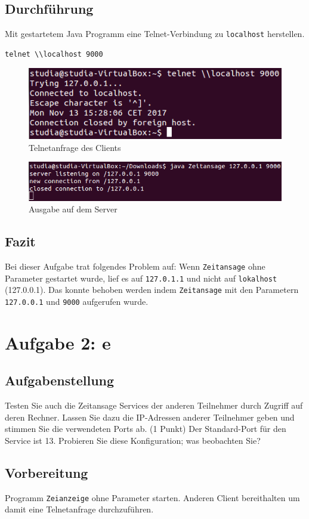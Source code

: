 \subsection{Durchführung}
Mit gestartetem Java Programm eine Telnet-Verbindung zu \texttt{localhost} herstellen.
\begin{lstlisting}
telnet \\localhost 9000
\end{lstlisting}
\begin{figure}[H]
	\centering
	\includegraphics[width=0.4 \linewidth]{images/17}
	\caption{Telnetanfrage des Clients}
\end{figure}
\begin{figure}[H]
	\centering
	\includegraphics[width=0.4 \linewidth]{images/16}
	\caption{Ausgabe auf dem Server}
\end{figure}

\subsection{Fazit}
Bei dieser Aufgabe trat folgendes Problem auf: Wenn \texttt{Zeitansage} ohne Parameter gestartet wurde, lief es auf \texttt{127.0.1.1} und nicht auf \texttt{lokalhost} (127.0.0.1). Das konnte behoben werden indem \texttt{Zeitansage} mit den Parametern \texttt{127.0.0.1} und \texttt{9000} aufgerufen wurde.

\section{Aufgabe 2: e}

\subsection{Aufgabenstellung}
Testen Sie auch die Zeitansage Services der anderen Teilnehmer durch Zugriff auf deren Rechner. Lassen Sie dazu die IP-Adressen anderer Teilnehmer geben und stimmen Sie die verwendeten Ports ab. (1 Punkt)
Der Standard-Port für den Service ist 13. Probieren Sie diese Konfiguration; was beobachten Sie?


\subsection{Vorbereitung}
Programm \texttt{Zeianzeige} ohne Parameter starten. Anderen Client bereithalten um damit eine Telnetanfrage durchzuführen.

